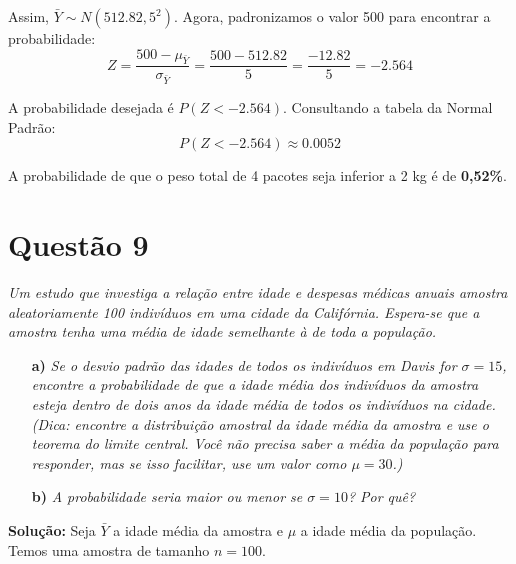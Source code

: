 \documentclass[12pt, a4paper]{article}
\begin{document}
\begin{itemize}
    Assim, $\bar{Y} \sim N(512.82, 5^2)$. Agora, padronizamos o valor 500 para encontrar a probabilidade:
    $$ Z = \frac{500 - \mu_{\bar{Y}}}{\sigma_{\bar{Y}}} = \frac{500 - 512.82}{5} = \frac{-12.82}{5} = -2.564 $$
    
    A probabilidade desejada é $P(Z < -2.564)$. Consultando a tabela da Normal Padrão:
    $$ P(Z < -2.564) \approx 0.0052 $$
    
    A probabilidade de que o peso total de 4 pacotes seja inferior a 2 kg é de \textbf{0,52\%}.
    
\end{itemize}

\section*{Questão 9}
\textit{Um estudo que investiga a relação entre idade e despesas médicas anuais amostra aleatoriamente 100 indivíduos em uma cidade da Califórnia. Espera-se que a amostra tenha uma média de idade semelhante à de toda a população.}
\begin{itemize}
    \item[\textbf{a)}] \textit{Se o desvio padrão das idades de todos os indivíduos em Davis for $\sigma = 15$, encontre a probabilidade de que a idade média dos indivíduos da amostra esteja dentro de dois anos da idade média de todos os indivíduos na cidade. (Dica: encontre a distribuição amostral da idade média da amostra e use o teorema do limite central. Você não precisa saber a média da população para responder, mas se isso facilitar, use um valor como $\mu = 30$.)}
    \item[\textbf{b)}] \textit{A probabilidade seria maior ou menor se $\sigma = 10$? Por quê?}
\end{itemize}

\textbf{Solução:}
Seja $\bar{Y}$ a idade média da amostra e $\mu$ a idade média da população. Temos uma amostra de tamanho $n=100$.
\end{document}
